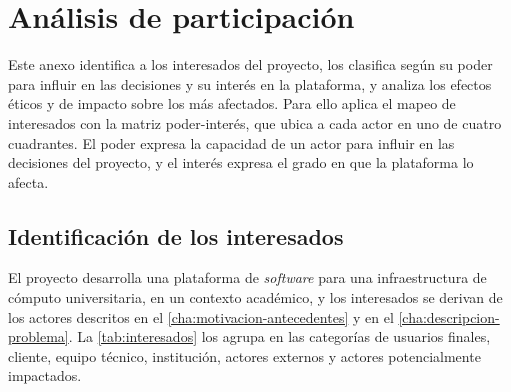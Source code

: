 %

\chapter{Análisis de participación}\label{anx:analisis-participacion}

Este anexo identifica a los interesados del proyecto, los clasifica según su poder para influir en las decisiones y su interés en la plataforma, y analiza los efectos éticos y de impacto sobre los más afectados. Para ello aplica el mapeo de interesados con la matriz poder-interés, que ubica a cada actor en uno de cuatro cuadrantes. El poder expresa la capacidad de un actor para influir en las decisiones del proyecto, y el interés expresa el grado en que la plataforma lo afecta.

\section{Identificación de los interesados}

El proyecto desarrolla una plataforma de \emph{software} para una infraestructura de cómputo universitaria, en un contexto académico, y los interesados se derivan de los actores descritos en el \cref{cha:motivacion-antecedentes} y en el \cref{cha:descripcion-problema}. La \cref{tab:interesados} los agrupa en las categorías de usuarios finales, cliente, equipo técnico, institución, actores externos y actores potencialmente impactados.

